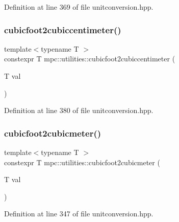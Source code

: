 Definition at line 369 of file unitconversion.\+hpp.

\mbox{\label{namespacempc_1_1utilities_a2e19dbeb14683c7f286d573587ffa3f8}} 
\subsubsection{\texorpdfstring{cubicfoot2cubiccentimeter()}{cubicfoot2cubiccentimeter()}}
{\footnotesize\ttfamily template$<$typename T $>$ \\
constexpr T mpc\+::utilities\+::cubicfoot2cubiccentimeter (\begin{DoxyParamCaption}\item[{T}]{val }\end{DoxyParamCaption})}



Definition at line 380 of file unitconversion.\+hpp.

\mbox{\label{namespacempc_1_1utilities_ad3d1fe7b84dc93ee23990c1f5eb06465}} 
\subsubsection{\texorpdfstring{cubicfoot2cubicmeter()}{cubicfoot2cubicmeter()}}
{\footnotesize\ttfamily template$<$typename T $>$ \\
constexpr T mpc\+::utilities\+::cubicfoot2cubicmeter (\begin{DoxyParamCaption}\item[{T}]{val }\end{DoxyParamCaption})}



Definition at line 347 of file unitconversion.\+hpp.

\mbox{\label{namespacempc_1_1utilities_a692da73ca8f5b1784035029b4ef88790}} 
